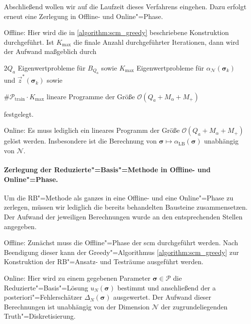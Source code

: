 \documentclass[../main.tex]{subfiles}
\begin{document}
Abschließend wollen wir auf die Laufzeit dieses Verfahrens eingehen.
Dazu erfolgt erneut eine Zerlegung in Offline- und Online"=Phase.

\begin{onoffdescription}
    \item[Offline:]
    Hier wird die in \cref{algorithm:scm_greedy} beschriebene Konstruktion durchgeführt.
    Ist $K_{\max}$ die finale Anzahl durchgeführter Iterationen, dann wird der Aufwand maßgeblich durch
    \begin{inlinelist}
        \item $2 Q_a$ Eigenwertprobleme für $B_{Q_a}$ sowie $K_{\max}$ Eigenwertprobleme für $\alpha_{\mathcal N}(\bm \sigma_{k})$ und $\vec{z}^{*}(\bm \sigma_{k})$ sowie
        \item $\#\mathcal P_{\mathrm{train}} \cdot K_{\max}$ lineare Programme der Größe $\mathcal O(Q_a + M_{\alpha} + M_{+})$
    \end{inlinelist}
    festgelegt.

    \item[Online:]
    Es muss lediglich ein lineares Programm der Größe $\mathcal O(Q_a + M_{\alpha} + M_{+})$ gelöst werden.
    Insbesondere ist die Berechnung von $\bm \sigma \mapsto \alpha_{\mathrm{LB}}(\bm \sigma)$ unabhängig von $\mathcal N$.
\end{onoffdescription}


\paragraph{Zerlegung der Reduzierte"=Basis"=Methode in Offline- und Online"=Phase.} %
\label{sub:zerlegung_in_offline_und_online_phase}

Um die RB"=Methode als ganzes in eine Offline- und eine Online"=Phase zu zerlegen, müssen wir lediglich die bereits behandelten Bausteine zusammensetzen.
Der Aufwand der jeweiligen Berechnungen wurde an den entsprechenden Stellen angegeben.

\begin{onoffdescription}
    \item[Offline:]
    Zunächst muss die Offline"=Phase der \acl{scm} durchgeführt werden.
    Nach Beendigung dieser kann der Greedy"=Algorithmus \ref{algorithm:scm_greedy} zur Konstruktion der RB"=Ansatz- und Testräume ausgeführt werden.

    \item[Online:]
    Hier wird zu einem gegebenen Parameter $\bm \sigma \in \mathcal P$ die Reduzierte"=Basis"=Lösung $u_{N}(\bm \sigma)$ bestimmt und anschließend der a posteriori"=Fehlerschätzer $\Delta_{N}(\bm \sigma)$ ausgewertet.
    Der Aufwand dieser Berechnungen ist unabhängig von der Dimension $\mathcal N$ der zugrundeliegenden Truth"=Diskretisierung.
\end{onoffdescription}
\end{document}
